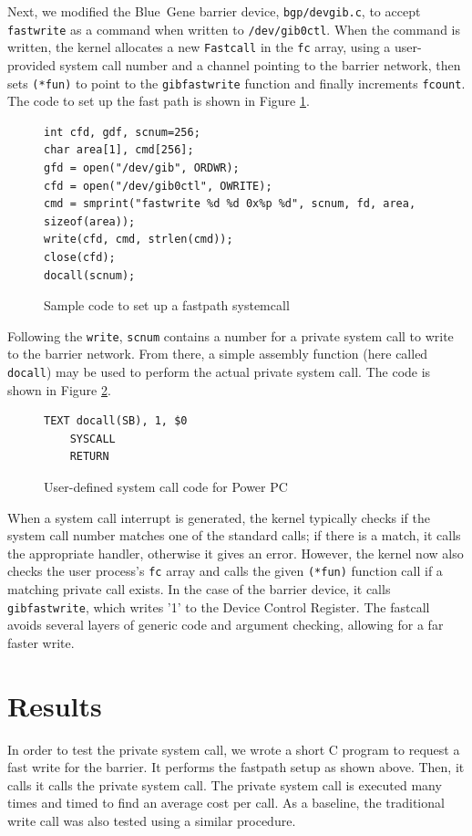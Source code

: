 \documentclass[letterpaper]{article}
\begin{document}
Next, we modified the Blue~Gene barrier device, {\tt bgp/devgib.c}, to accept {\tt fastwrite} as a command when written to {\tt /dev/gib0ctl}. When the command is written, the kernel allocates a new {\tt Fastcall} in the {\tt fc} array, using a user-provided system call number and a channel pointing to the barrier network, then sets {\tt (*fun)} to point to the {\tt gibfastwrite} function and finally increments {\tt fcount}. The code to set up the fast path is shown in Figure \ref{code}.
\begin{figure}
\begin{verbatim}
int cfd, gdf, scnum=256;
char area[1], cmd[256];
gfd = open("/dev/gib", ORDWR);
cfd = open("/dev/gib0ctl", OWRITE);
cmd = smprint("fastwrite %d %d 0x%p %d", scnum, fd, area, sizeof(area));
write(cfd, cmd, strlen(cmd));
close(cfd);
docall(scnum);
\end{verbatim}
\caption{\label{code}Sample code to set up a fastpath systemcall}
\end{figure}

Following the {\tt write}, {\tt scnum} contains a number for a private system call to write to the barrier network. From there, a simple assembly function (here called {\tt docall}) may be used to perform the actual private system call. The code is shown in Figure \ref{docall}. 

\begin{figure}
\begin{verbatim}
TEXT docall(SB), 1, $0
    SYSCALL
    RETURN
\end{verbatim}
\caption{\label{docall}User-defined system call code for Power PC}
\end{figure}

When a system call interrupt is generated, the kernel typically checks if the system call number matches one of the standard calls; if there is a match, it calls the appropriate handler, otherwise it gives an error. However, the kernel now also checks the user process's {\tt fc} array and calls the given {\tt (*fun)} function call if a matching private call exists. In the case of the barrier device, it calls {\tt gibfastwrite}, which writes '1' to the Device Control Register. The fastcall avoids several layers of generic code and argument checking, allowing for a far faster write.

\section{Results}
In order to test the private system call, we wrote a short C program to request a fast write for the barrier. It performs the fastpath setup as shown above. Then, it calls it calls the private system call. The private system call is executed many times and timed to find an average cost per call. As a baseline, the traditional write call was also tested using a similar procedure.
\end{document}
